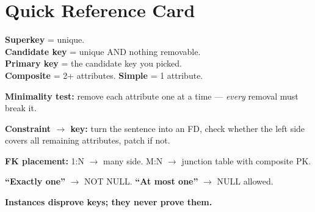 \documentclass[12pt]{article}
\begin{document}
\section*{Quick Reference Card}

\textbf{Superkey} = unique. \\
\textbf{Candidate key} = unique AND nothing removable. \\
\textbf{Primary key} = the candidate key you picked. \\
\textbf{Composite} = 2+ attributes. \textbf{Simple} = 1 attribute.

\textbf{Minimality test:} remove each attribute one at a time --- \emph{every}
removal must break it.

\textbf{Constraint $\to$ key:} turn the sentence into an FD, check whether the
left side covers all remaining attributes, patch if not.

\textbf{FK placement:} 1:N $\to$ many side. M:N $\to$ junction table with
composite PK.

\textbf{``Exactly one''} $\to$ NOT NULL. \textbf{``At most one''} $\to$ NULL allowed.

\textbf{Instances disprove keys; they never prove them.}
\end{document}
